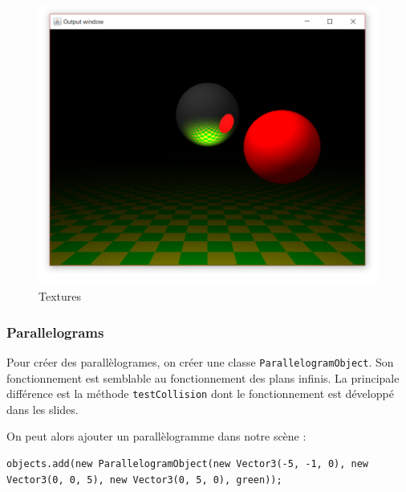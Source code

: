 \begin{figure}[H]
	\caption{\label{10_4} Textures}
	\centering
	\includegraphics[scale = 0.4]{10_4.png}
\end{figure}

\subsubsection{Parallelograms}

Pour créer des parallèlogrames, on créer une classe \texttt{ParallelogramObject}. Son fonctionnement est semblable au fonctionnement des plans infinis. La principale différence est la méthode \texttt{testCollision} dont le fonctionnement est développé dans les slides.


On peut alors ajouter un parallèlogramme dans notre scène :

\begin{lstlisting}
objects.add(new ParallelogramObject(new Vector3(-5, -1, 0), new Vector3(0, 0, 5), new Vector3(0, 5, 0), green));
\end{lstlisting}

